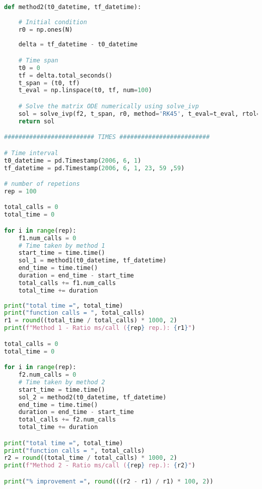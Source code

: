 \begin{lstlisting}[language=Python, caption=Broadcast - Receive centrality comparison]
def method2(t0_datetime, tf_datetime):
    
    # Initial condition 
    r0 = np.ones(N)
    
    delta = tf_datetime - t0_datetime

    # Time span
    t0 = 0
    tf = delta.total_seconds() 
    t_span = (t0, tf) 
    t_eval = np.linspace(t0, tf, num=100)

    # Solve the matrix ODE numerically using solve_ivp
    sol = solve_ivp(f2, t_span, r0, method='RK45', t_eval=t_eval, rtol=1e-4, atol=1e-4)
    return sol

######################### TIMES #########################

# Time interval 
t0_datetime = pd.Timestamp(2006, 6, 1)
tf_datetime = pd.Timestamp(2006, 6, 1, 23, 59 ,59)

# number of repetions
rep = 100

total_calls = 0
total_time = 0

for i in range(rep):
    f1.num_calls = 0 
    # Time taken by method 1
    start_time = time.time()
    sol_1 = method1(t0_datetime, tf_datetime)
    end_time = time.time()
    duration = end_time - start_time
    total_calls += f1.num_calls
    total_time += duration
    
print("total time =", total_time)
print("function calls = ", total_calls)    
r1 = round((total_time / total_calls) * 1000, 2)   
print(f"Method 1 - Ratio ms/call ({rep} rep.): {r1}")  

total_calls = 0
total_time = 0

for i in range(rep):
    f2.num_calls = 0 
    # Time taken by method 2
    start_time = time.time()
    sol_2 = method2(t0_datetime, tf_datetime)
    end_time = time.time()
    duration = end_time - start_time
    total_calls += f2.num_calls
    total_time += duration

print("total time =", total_time)
print("function calls = ", total_calls) 
r2 = round((total_time / total_calls) * 1000, 2)
print(f"Method 2 - Ratio ms/call ({rep} rep.): {r2}") 

print("% improvement =", round(((r2 - r1) / r1) * 100, 2))
\end{lstlisting}